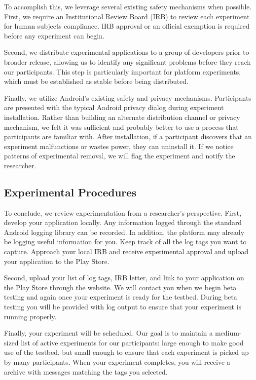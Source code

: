 To accomplish this, we leverage several existing safety mechanisms when
possible. First, we require an Institutional Review Board (IRB) to review
each \PhoneLab{} experiment for human subjects compliance. IRB approval or an
official exemption is required before any \PhoneLab{} experiment can begin.

Second, we distribute experimental applications to a group of developers
prior to broader release, allowing us to identify any significant problems
before they reach our participants. This step is particularly important for
platform experiments, which must be established as stable before being
distributed.

Finally, we utilize Android's existing safety and privacy mechanisms.
Participants are presented with the typical Android privacy dialog during
experiment installation. Rather than building an alternate distribution
channel or privacy mechanism, we felt it was sufficient and probably better
to use a process that participants are familiar with. After installation, if
a participant discovers that an experiment malfunctions or wastes power, they
can uninstall it. If we notice patterns of experimental removal, we will flag
the experiment and notify the researcher.

\subsection{Experimental Procedures}

To conclude, we review \PhoneLab{} experimentation from a researcher's
perspective. First, develop your application locally. Any information logged
through the standard Android logging library can be recorded. In addition,
the platform may already be logging useful information for you. Keep track of
all the log tags you want \PhoneLab{} to capture. Approach your local IRB and
receive experimental approval and upload your application to the Play Store.

Second, upload your list of log tags, IRB letter, and link to your
application on the Play Store through the \PhoneLab{} website. We will
contact you when we begin beta testing and again once your experiment is
ready for the testbed. During beta testing you will be provided with
\PhoneLab{} log output to ensure that your experiment is running properly.

Finally, your experiment will be scheduled. Our goal is to maintain a
medium-sized list of active experiments for our participants: large enough to
make good use of the testbed, but small enough to ensure that each experiment
is picked up by many participants. When your experiment completes, you will
receive a archive with messages matching the tags you selected.
